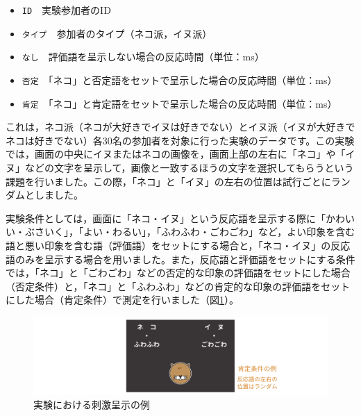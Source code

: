 \documentclass[
  12pt,
  a5jpaper,
  lualatex, ja=standard]{bxjsbook}
\providecommand{\tightlist}{%
  \setlength{\itemsep}{0pt}\setlength{\parskip}{0pt}}
\newenvironment{jmvvar}{%
	\begin{center}%
	\begin{tcolorbox}[%
		title=変数一覧,
		colframe=daidai,
		colbacktitle=daidai!30!white,
		coltitle=daidai!10!black,
		colback=daidai!2!white,
		breakable,
		width=.9\textwidth
		]\small\addtolength{\leftmargini}{-3\labelsep}%
	}%
	{\end{tcolorbox}\end{center}}
\begin{document}
\begin{jmvvar}

\begin{itemize}
\tightlist
\item
  \texttt{ID}　実験参加者のID
\item
  \texttt{タイプ}　参加者のタイプ（ネコ派，イヌ派）
\item
  \texttt{なし}　評価語を呈示しない場合の反応時間（単位：ms）
\item
  \texttt{否定}　「ネコ」と否定語をセットで呈示した場合の反応時間（単位：ms）
\item
  \texttt{肯定}　「ネコ」と肯定語をセットで呈示した場合の反応時間（単位：ms）
\end{itemize}

\end{jmvvar}

これは，ネコ派（ネコが大好きでイヌは好きでない）とイヌ派（イヌが大好きでネコは好きでない）各30名の参加者を対象に行った実験のデータです。この実験では，画面の中央にイヌまたはネコの画像を，画面上部の左右に「ネコ」や「イヌ」などの文字を呈示して，画像と一致するほうの文字を選択してもらうという課題を行いました。この際，「ネコ」と「イヌ」の左右の位置は試行ごとにランダムとしました。

実験条件としては，画面に「ネコ・イヌ」という反応語を呈示する際に「かわいい・ぶさいく」，「よい・わるい」，「ふわふわ・ごわごわ」など，よい印象を含む語と悪い印象を含む語（評価語）をセットにする場合と，「ネコ・イヌ」の反応語のみを呈示する場合を用いました。また，反応語と評価語をセットにする条件では，「ネコ」と「ごわごわ」などの否定的な印象の評価語をセットにした場合（否定条件）と，「ネコ」と「ふわふわ」などの肯定的な印象の評価語をセットにした場合（肯定条件）で測定を行いました（図\ref{fig:ANOVA-rm-experiment}）。

\begin{figure}[!ht]

{\centering \includegraphics[width=1\linewidth]{images/ANOVA/rm-experiment} 

}

\caption{実験における刺激呈示の例}\label{fig:ANOVA-rm-experiment}
\end{figure}
\end{document}
